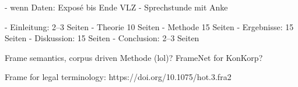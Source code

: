 - wenn Daten: Exposé bis Ende VLZ
- Sprechstunde mit Anke

- Einleitung: 2--3 Seiten
- Theorie 10 Seiten
- Methode 15 Seiten
- Ergebnisse: 15 Seiten
- Diskussion: 15 Seiten
- Conclusion: 2--3 Seiten

Frame semantics, corpus driven Methode (lol)?
FrameNet for KonKorp?

Frame for legal terminology: https://doi.org/10.1075/hot.3.fra2
